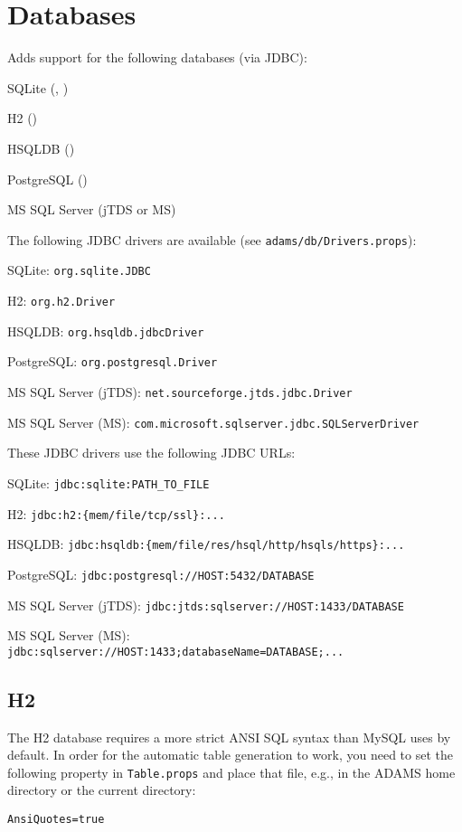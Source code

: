 \documentclass[a4paper]{book}
\begin{document}
\chapter{Databases}
Adds support for the following databases (via JDBC):
\begin{tight_itemize}
  \item SQLite (\cite{sqlite}, \cite{sqlitexerial})
  \item H2 (\cite{h2})
  \item HSQLDB (\cite{hsqldb})
  \item PostgreSQL (\cite{postgresql})
  \item MS SQL Server (jTDS\cite{jtds} or MS\cite{mssql})
\end{tight_itemize}
The following JDBC drivers are available (see \texttt{adams/db/Drivers.props}):
\begin{tight_itemize}
  \item SQLite: \verb|org.sqlite.JDBC|
  \item H2: \verb|org.h2.Driver|
  \item HSQLDB: \verb|org.hsqldb.jdbcDriver|
  \item PostgreSQL: \verb|org.postgresql.Driver|
  \item MS SQL Server (jTDS): \verb|net.sourceforge.jtds.jdbc.Driver|
  \item MS SQL Server (MS): \verb|com.microsoft.sqlserver.jdbc.SQLServerDriver|
\end{tight_itemize}
These JDBC drivers use the following JDBC URLs:
\begin{tight_itemize}
  \item SQLite: \verb|jdbc:sqlite:PATH_TO_FILE|
  \item H2: \verb|jdbc:h2:{mem/file/tcp/ssl}:...|
  \item HSQLDB: \verb|jdbc:hsqldb:{mem/file/res/hsql/http/hsqls/https}:...|
  \item PostgreSQL: \verb|jdbc:postgresql://HOST:5432/DATABASE|
  \item MS SQL Server (jTDS): \verb|jdbc:jtds:sqlserver://HOST:1433/DATABASE|
  \item MS SQL Server (MS): \verb|jdbc:sqlserver://HOST:1433;databaseName=DATABASE;...|
\end{tight_itemize}

\clearpage
\section{H2}
The H2 database requires a more strict ANSI SQL syntax than MySQL uses by default.
In order for the automatic table generation to work, you need to set the following property
in \texttt{Table.props} and place that file, e.g., in the ADAMS home directory or the current directory:
\begin{verbatim}
AnsiQuotes=true
\end{verbatim}


\end{document}
